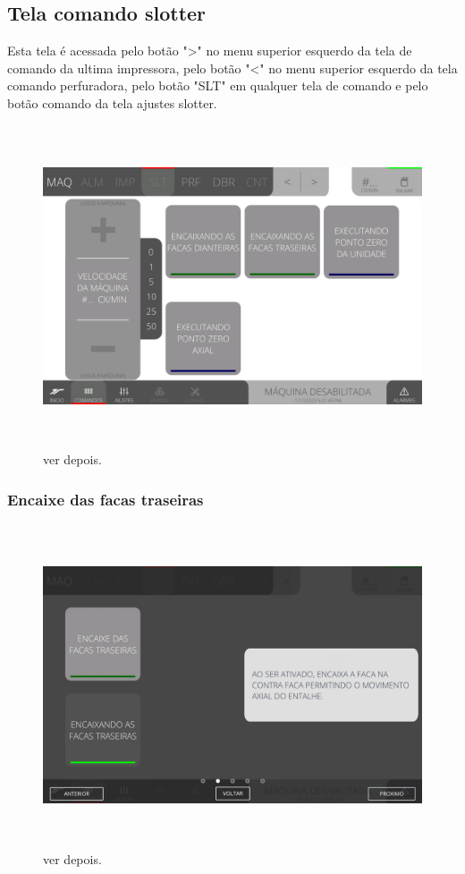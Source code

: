 \thispagestyle{fancy}
\vspace*{\fill}
\subsection{Tela comando slotter}
 Esta tela é acessada pelo botão "\textgreater" no menu superior esquerdo da tela de comando da ultima impressora, pelo botão "\textless{}" no menu superior esquerdo da tela comando perfuradora, pelo botão "SLT" em qualquer tela de comando e pelo botão comando da tela ajustes slotter.
\begin{figure}[h]
  \centering
  \includegraphics[width=576px,height=360px]{src/images/05-slotter/commands/e-Tela-Principal.png}
  \caption{ver depois.}
   \label{}
\end{figure}

\newpage
\thispagestyle{fancy}
\vspace*{\fill}
\subsubsection{\small{Encaixe das facas traseiras}}
\begin{figure}[h]
  \centering
  \includegraphics[width=576px,height=360px]{src/images/05-slotter/commands/e-2.png}
  \caption{ver depois.}
   \label{}
\end{figure}
\vspace*{\fill}


